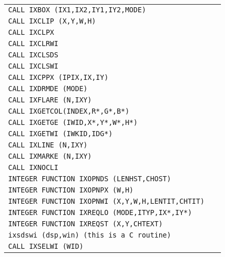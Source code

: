 \begin{longtable}{|>{\small\tt}p{.87\linewidth}r|}
\hline
CALL IXBOX (IX1,IX2,IY1,IY2,MODE)                     & \pageref{IXBOX}       \\
CALL IXCLIP (X,Y,W,H)                                 & \pageref{IXCLIP}      \\
CALL IXCLPX                                           & \pageref{IXCLPX}      \\
CALL IXCLRWI                                          & \pageref{IXCLRWI}     \\
CALL IXCLSDS                                          & \pageref{IXCLSDS}     \\
CALL IXCLSWI                                          & \pageref{IXCLSWI}     \\
CALL IXCPPX (IPIX,IX,IY)                              & \pageref{IXCPPX}      \\
CALL IXDRMDE (MODE)                                   & \pageref{IXDRMDE}     \\
CALL IXFLARE (N,IXY)                                  & \pageref{IXFLARE}     \\
CALL IXGETCOL(INDEX,R*,G*,B*)                         & \pageref{IXGETCOL}    \\
CALL IXGETGE (IWID,X*,Y*,W*,H*)                       & \pageref{IXGETGE}     \\
CALL IXGETWI (IWKID,IDG*)                             & \pageref{IXGETWI}     \\
CALL IXLINE (N,IXY)                                   & \pageref{IXLINE}      \\
CALL IXMARKE (N,IXY)                                  & \pageref{IXMARKE}     \\
CALL IXNOCLI                                          & \pageref{IXNOCLI}     \\
INTEGER FUNCTION IXOPNDS (LENHST,CHOST)               & \pageref{IXOPNDS}     \\
INTEGER FUNCTION IXOPNPX (W,H)                        & \pageref{IXOPNPX}     \\
INTEGER FUNCTION IXOPNWI (X,Y,W,H,LENTIT,CHTIT)       & \pageref{IXOPNWI}     \\
INTEGER FUNCTION IXREQLO (MODE,ITYP,IX*,IY*)          & \pageref{IXREQLO}     \\
INTEGER FUNCTION IXREQST (X,Y,CHTEXT)                 & \pageref{IXREQST}     \\
ixsdswi (dsp,win) ({\rm this is a C routine})         & \pageref{ixsdswi}     \\
CALL IXSELWI (WID)                                    & \pageref{IXSELWI}     \\

\end{longtable}
